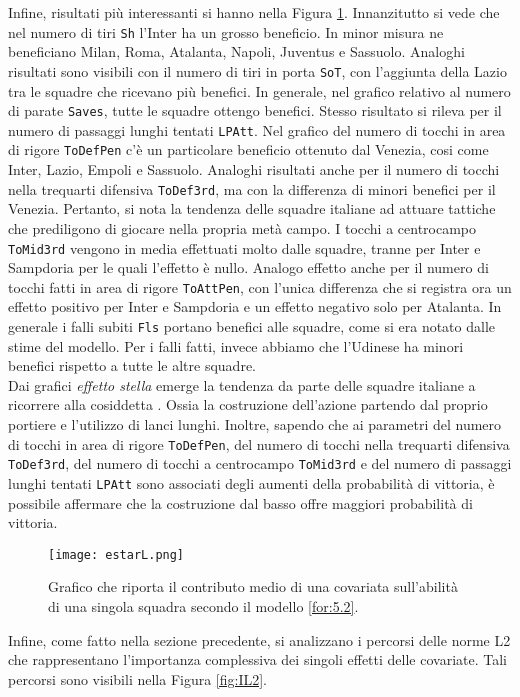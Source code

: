 Infine, risultati più interessanti si hanno nella Figura \ref{fig:effstar3}. Innanzitutto si vede che nel numero di tiri \texttt{Sh} l'Inter ha un grosso beneficio. In minor misura ne beneficiano Milan, Roma, Atalanta, Napoli, Juventus e Sassuolo. Analoghi risultati sono visibili con il numero di tiri in porta \texttt{SoT}, con l'aggiunta della Lazio tra le squadre che ricevano più benefici. In generale, nel grafico relativo al numero di parate \texttt{Saves}, tutte le squadre ottengo benefici. Stesso risultato si rileva per il numero di passaggi lunghi tentati \texttt{LPAtt}. Nel grafico del numero di tocchi in area di rigore \texttt{ToDefPen} c'è un particolare beneficio ottenuto dal Venezia, cosi come Inter, Lazio, Empoli e Sassuolo. Analoghi risultati anche per il numero di tocchi nella trequarti difensiva \texttt{ToDef3rd}, ma con la differenza di minori benefici per il Venezia. Pertanto, si nota la tendenza delle squadre italiane ad attuare tattiche che prediligono di giocare nella propria metà campo. I tocchi a centrocampo \texttt{ToMid3rd} vengono in media effettuati molto dalle squadre, tranne per Inter e Sampdoria per le quali l'effetto è nullo. Analogo effetto anche per il numero di tocchi fatti in area di rigore \texttt{ToAttPen}, con l'unica differenza che si registra ora un effetto positivo per Inter e Sampdoria e un effetto negativo solo per Atalanta. In generale i falli subiti \texttt{Fls} portano benefici alle squadre, come si era notato dalle stime del modello. Per i falli fatti, invece abbiamo che l'Udinese ha minori benefici rispetto a tutte le altre squadre. \\
Dai grafici \emph{effetto stella} emerge la tendenza da parte delle squadre italiane a ricorrere alla cosiddetta \textit{\cite{costrdalbasso}}. Ossia la costruzione dell'azione partendo dal proprio portiere e l'utilizzo di lanci lunghi. Inoltre, sapendo che ai parametri del numero di tocchi in area di rigore \texttt{ToDefPen}, del numero di tocchi nella trequarti difensiva \texttt{ToDef3rd}, del numero di tocchi a centrocampo \texttt{ToMid3rd} e del numero di passaggi lunghi tentati \texttt{LPAtt} sono associati degli aumenti della probabilità di vittoria, è possibile affermare che la costruzione dal basso offre maggiori probabilità di vittoria.\\
\begin{figure}[!htbp]
	\begin{center}
		\texttt{[image: estarL.png]}
		\caption{Grafico che riporta il contributo medio di una covariata sull'abilità di una singola squadra secondo il modello \ref{for:5.2}.} \label{fig:effstar3}
	\end{center}
\end{figure}
Infine, come fatto nella sezione precedente, si analizzano i percorsi delle norme L2 che rappresentano l'importanza complessiva dei singoli effetti delle covariate. Tali percorsi sono visibili nella Figura \ref{fig:IL2}.

